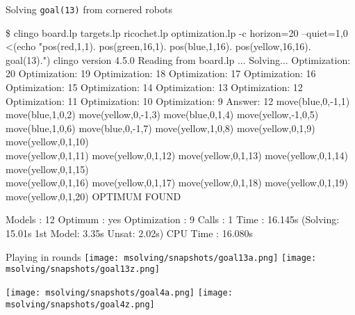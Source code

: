 \begin{frame}{Solving \lstinline{goal(13)} from cornered robots}
\tiny\vspace{-5pt}
\begin{semiverbatim}
\$ clingo board.lp targets.lp ricochet.lp optimization.lp -c horizon=20 --quiet=1,0 \\
        <(echo "pos(red,1,1). pos(green,16,1). pos(blue,1,16). pos(yellow,16,16).   goal(13).")\pause
clingo version 4.5.0
Reading from board.lp ...
Solving...
Optimization: 20
Optimization: 19
Optimization: 18
Optimization: 17
Optimization: 16
Optimization: 15
Optimization: 14
Optimization: 13
Optimization: 12
Optimization: 11
Optimization: 10
Optimization: 9
Answer: 12
\alert<2>{move(blue,0,-1,1)   move(blue,1,0,2)    move(yellow,0,-1,3) move(blue,0,1,4)    move(yellow,-1,0,5) \\
move(blue,1,0,6)    move(blue,0,-1,7)   move(yellow,1,0,8)  move(yellow,0,1,9)}  move(yellow,0,1,10) \\
move(yellow,0,1,11) move(yellow,0,1,12) move(yellow,0,1,13) move(yellow,0,1,14) move(yellow,0,1,15) \\
move(yellow,0,1,16) move(yellow,0,1,17) move(yellow,0,1,18) move(yellow,0,1,19) move(yellow,0,1,20)
OPTIMUM FOUND

Models       : 12
  Optimum    : yes
Optimization : 9
Calls        : 1
Time         : 16.145s (Solving: 15.01s 1st Model: 3.35s Unsat: 2.02s)
CPU Time     : 16.080s
\end{semiverbatim}
\end{frame}
\begin{frame}[c]{Playing in rounds}
   \qquad
  \texttt{[image: msolving/snapshots/goal13a.png]}
  \qquad
  \texttt{[image: msolving/snapshots/goal13z.png]}
  \par\bigskip
   \qquad
  \texttt{[image: msolving/snapshots/goal4a.png]}
  \qquad
  \texttt{[image: msolving/snapshots/goal4z.png]}
\end{frame}
